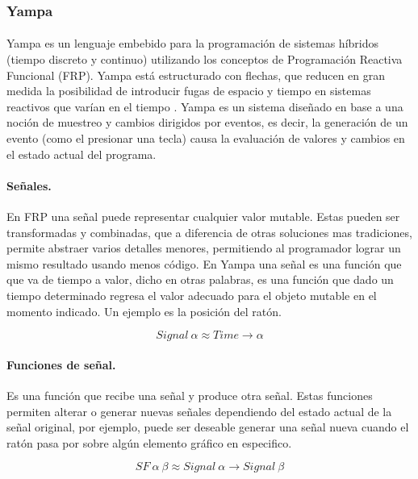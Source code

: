 \documentclass{standalone}
\begin{document}
\subsubsection{Yampa}

\paragraph{}
Yampa es un lenguaje embebido para la programación de sistemas híbridos (tiempo discreto y continuo) utilizando los conceptos de Programación Reactiva Funcional (FRP). Yampa está estructurado con flechas, que reducen en gran medida la posibilidad de introducir fugas de espacio y tiempo en sistemas reactivos que varían en el tiempo \cite{wiki:Yampa}. Yampa es un sistema diseñado en base a una noción de muestreo y cambios dirigidos por eventos, es decir, la generación de un evento (como el presionar una tecla) causa la evaluación de valores y cambios en el estado actual del programa.

\paragraph{Señales.}
En FRP una señal puede representar cualquier valor mutable. Estas pueden ser transformadas y combinadas, que a diferencia de otras soluciones mas tradiciones, permite abstraer varios detalles menores, permitiendo al programador lograr un mismo resultado usando menos código. En Yampa una señal es una función que que va de tiempo a valor, dicho en otras palabras, es una función que dado un tiempo determinado regresa el valor adecuado para el objeto mutable en el momento indicado. Un ejemplo es la posición del ratón.

\begin{equation}
Signal \ \alpha \approx Time \rightarrow \alpha
\end{equation}

\paragraph{Funciones de señal.}
Es una función que recibe una señal y produce otra señal. Estas funciones permiten alterar o generar nuevas señales dependiendo del estado actual de la señal original, por ejemplo, puede ser deseable generar una señal nueva cuando el ratón pasa por sobre algún elemento gráfico en especifico.

\begin{equation}
SF \ \alpha \ \beta \approx Signal \ \alpha \rightarrow Signal \ \beta
\end{equation}
\end{document}
